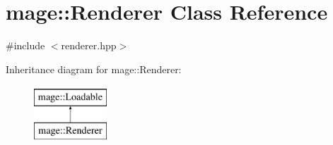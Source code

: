 \hypertarget{classmage_1_1_renderer}{}\section{mage\+:\+:Renderer Class Reference}
\label{classmage_1_1_renderer}


{\ttfamily \#include $<$renderer.\+hpp$>$}

Inheritance diagram for mage\+:\+:Renderer\+:\begin{figure}[H]
\begin{center}
\leavevmode
\includegraphics[height=2.000000cm]{classmage_1_1_renderer}
\end{center}
\end{figure}
